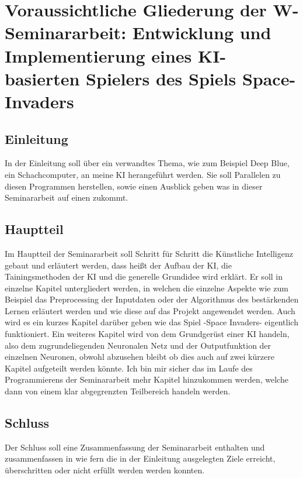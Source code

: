 \documentclass[12pt]{article}
\begin{document}
\ohead{\today}
\section*{Voraussichtliche Gliederung der W-Seminararbeit: Entwicklung und Implementierung eines KI-basierten Spielers des Spiels Space-Invaders }
\subsection*{Einleitung}
In der Einleitung soll über ein verwandtes Thema, wie zum Beispiel Deep Blue, ein Schachcomputer, an meine KI herangeführt werden. Sie soll Parallelen zu diesen Programmen herstellen, sowie einen Ausblick geben was in dieser Seminararbeit auf einen zukommt.  
\subsection*{Hauptteil}
 Im Hauptteil der Seminararbeit soll Schritt für Schritt die Künstliche Intelligenz gebaut und erläutert werden, dass heißt der Aufbau der KI, die Tainingsmethoden der KI und die generelle Grundidee wird erklärt. Er soll in einzelne Kapitel untergliedert werden, in welchen die einzelne Aspekte wie zum Beispiel das Preprocessing der Inputdaten oder der Algorithmus des bestärkenden Lernen erläutert werden und wie diese auf das Projekt angewendet werden. Auch wird es ein kurzes Kapitel darüber geben wie  das Spiel -Space Invaders- eigentlich funktioniert. Ein weiteres Kapitel wird von dem Grundgerüst einer KI handeln, also dem zugrundeliegenden Neuronalen Netz und der Outputfunktion der einzelnen Neuronen, obwohl abzusehen bleibt ob dies auch auf zwei kürzere Kapitel aufgeteilt werden könnte. Ich bin mir sicher das im Laufe des Programmierens der Seminararbeit mehr Kapitel hinzukommen werden, welche dann von einem klar abgegrenzten Teilbereich handeln werden. 
\subsection*{Schluss}
Der Schluss soll eine Zusammenfassung der Seminararbeit enthalten und zusammenfassen in wie fern die in der Einleitung ausgelegten Ziele erreicht, überschritten oder nicht erfüllt werden werden konnten.
\end{document}
